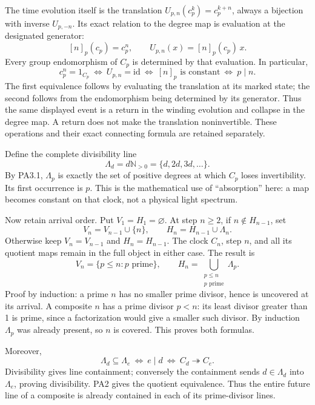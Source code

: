 The time evolution itself is the translation \(U_{p,n}(c_p^k)=c_p^{k+n}\), always a bijection with inverse \(U_{p,-n}\). Its exact relation to the degree map is evaluation at the designated generator: \[
[n]_p(c_p)=c_p^n,\qquad U_{p,n}(x)=[n]_p(c_p)\,x.
\] Every group endomorphism of \(C_p\) is determined by that evaluation. In particular, \[
c_p^n=1_{C_p}
\ \Longleftrightarrow\ U_{p,n}=\mathrm{id}
\ \Longleftrightarrow\ [n]_p\text{ is constant}
\ \Longleftrightarrow\ p\mid n.
\] The first equivalence follows by evaluating the translation at its marked state; the second follows from the endomorphism being determined by its generator. Thus the same displayed event is a return in the winding evolution and collapse in the degree map. A return does not make the translation noninvertible. These operations and their exact connecting formula are retained separately.

Define the complete divisibility line \[
\Lambda_d=d\mathbb N_{>0}=\{d,2d,3d,\ldots\}.
\] By PA3.1, \(\Lambda_p\) is exactly the set of positive degrees at which \(C_p\) loses invertibility. Its first occurrence is \(p\). This is the mathematical use of ``absorption'' here: a map becomes constant on that clock, not a physical light spectrum.

Now retain arrival order. Put \(V_1=H_1=\varnothing\). At step \(n\ge2\), if \(n\notin H_{n-1}\), set \[
V_n=V_{n-1}\cup\{n\},\qquad H_n=H_{n-1}\cup\Lambda_n.
\] Otherwise keep \(V_n=V_{n-1}\) and \(H_n=H_{n-1}\). The clock \(C_n\), step \(n\), and all its quotient maps remain in the full object in either case. The result is \[
V_n=\{p\le n:p\text{ prime}\},\qquad
H_n=\bigcup_{\substack{p\le n\\p\text{ prime}}}\Lambda_p.
\tag{PA3.2}
\] Proof by induction: a prime \(n\) has no smaller prime divisor, hence is uncovered at its arrival. A composite \(n\) has a prime divisor \(p<n\): its least divisor greater than 1 is prime, since a factorization would give a smaller such divisor. By induction \(\Lambda_p\) was already present, so \(n\) is covered. This proves both formulas.

Moreover, \[
\Lambda_d\subseteq\Lambda_e
\ \Longleftrightarrow\ e\mid d
\ \Longleftrightarrow\ C_d\twoheadrightarrow C_e.
\tag{PA3.3}
\] Divisibility gives line containment; conversely the containment sends \(d\in\Lambda_d\) into \(\Lambda_e\), proving divisibility. PA2 gives the quotient equivalence. Thus the entire future line of a composite is already contained in each of its prime-divisor lines.

